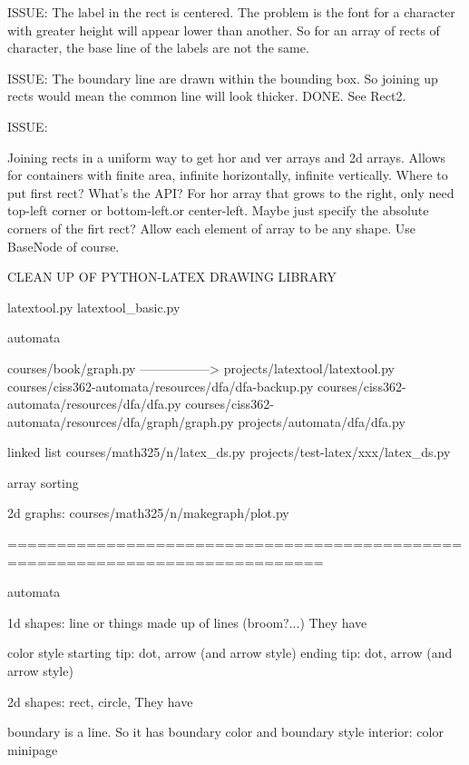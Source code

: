 ISSUE:
The label in the rect is centered.
The problem is the font for a character with greater height will
appear lower than another.
So for an array of rects of character, the base line of the
labels are not the same.

ISSUE:
The boundary line are drawn within the bounding box.
So joining up rects would mean the common line will look thicker.
DONE. See Rect2.

ISSUE:
\begin{mylist}
\li Joining rects in a uniform way to get hor and ver arrays and 2d arrays.
Allows for containers with finite area, infinite horizontally, infinite
vertically.
\li Where to put first rect? What's the API?
For hor array that grows to the right, 
only need top-left corner or bottom-left.or center-left.
Maybe just specify the absolute corners of the firt rect?
\li Allow each element of array to be any shape. Use BaseNode of course.
\end{mylist}

\begin{console}
CLEAN UP OF PYTHON-LATEX DRAWING LIBRARY

latextool.py
latextool_basic.py

automata

courses/book/graph.py -----------------> projects/latextool/latextool.py
courses/ciss362-automata/resources/dfa/dfa-backup.py
courses/ciss362-automata/resources/dfa/dfa.py
courses/ciss362-automata/resources/dfa/graph/graph.py
projects/automata/dfa/dfa.py

linked list
courses/math325/n/latex_ds.py
projects/test-latex/xxx/latex_ds.py

array sorting

2d graphs:
courses/math325/n/makegraph/plot.py

==============================================================================

automata 

\end{console}


1d shapes: line or things made up of lines (broom?...)
They have
\begin{itemize}
\li color
\li style
\li starting tip: dot, arrow (and arrow style)
\li ending tip: dot, arrow (and arrow style)
\end{itemize}

2d shapes: rect, circle, 
They have
\begin{itemize}
\li boundary is a line. So it has boundary color and boundary style
\li interior: color
\li minipage
\end{itemize}

